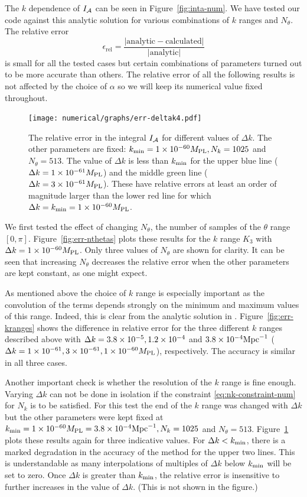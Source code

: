 % 
The $k$ dependence of $I_\A$ can be seen in Figure~\ref{fig:inta-num}. 
We have tested our code against this analytic solution for various
combinations of $k$ ranges and $N_\theta$. The relative error
%
\begin{equation}
 \epsilon_\mathrm{rel} = \frac{|\mathrm{analytic}- \mathrm{calculated}
|}{|\mathrm{analytic}|}
\end{equation}
%
is small for all the tested cases but certain combinations of
parameters turned out to be more accurate than others. The relative error of
all the following results is not affected by the choice of $\alpha$ so
we will keep its numerical value fixed throughout.

\begin{figure}[htb]
 \centering
 \texttt{[image: numerical/graphs/err-deltak4.pdf]}
 \caption[Relative error in the integral $I_\A$]{The relative error in the
integral $I_\A$ for different values of $\Delta k$.
The other parameters are fixed: $k_{\mathrm{min}}=1\times10^{-60}M_{\mathrm{PL}}, N_k = 1025$ and
$N_\theta=513$. 
The value of $\Delta k$ is less than $k_{\mathrm{min}}$ for the upper 
blue line ($\Delta k=1\times 10^{-61}M_{\mathrm{PL}}$) and the middle green line ($\Delta
k=3\times 10^{-61}M_{\mathrm{PL}}$). These have relative errors at least an order of magnitude larger
than the lower red line for which $\Delta k=k_{\mathrm{min}}=1\times 10^{-60}M_{\mathrm{PL}}$.}
 \label{fig:err-deltaks}
\end{figure}


We first tested the effect of changing $N_\theta$, the number of
samples of the $\theta$ range $[0,\pi]$.  Figure~\ref{fig:err-nthetas}
plots these results for the $k$ range $K_3$ with $\Delta k =
1\times 10^{-60}M_{\mathrm{PL}}$. Only three values of $N_\theta$ are shown for clarity. It
can be seen that increasing $N_\theta$ decreases the relative error when the other
parameters are kept constant, as one
might expect.


As mentioned above the choice of $k$ range is especially important as
the convolution of the terms depends strongly on the minimum and
maximum values of this range. Indeed, this is clear from the analytic
solution in . Figure~\ref{fig:err-kranges}
shows the difference in relative error for the three different $k$
ranges described above with 
$\Delta k= 3.8\times 10^{-5}, 1.2\times 10^{-4}$ and $3.8\times 10^{-4}\mathrm{Mpc}^{-1}$
($\Delta k= 1\times 10^{-61}, 3\times 10^{-61},1\times 10^{-60}M_{\mathrm{PL}}$),
respectively. The accuracy is similar in all three cases.


Another important check is whether the resolution of the $k$ range is
fine enough. Varying $\Delta k$ can not be done in isolation if the
constraint \eqref{eq:nk-constraint-num} for $N_k$ is to
be satisfied. For this test the end of the $k$ range was changed with $\Delta k$
but the other parameters were kept fixed at $k_{\mathrm{min}}=1\times 10^{-60}M_{\mathrm{PL}}=3.8\times 10^{-4}\mathrm{Mpc}^{-1},
N_k = 1025$ and $N_\theta=513$. Figure~\ref{fig:err-deltaks} plots
these results again for three indicative values.  For $\Delta
k<k_{\mathrm{min}}$, there is a marked degradation in
the accuracy of the method for the upper two lines. This is understandable as many
interpolations of multiples of $\Delta k$ below $k_{\mathrm{min}}$ will be set to
zero. Once $\Delta k$ is greater than $k_{\mathrm{min}}$, the relative error is
insensitive to further increases in the value of $\Delta k$. (This is not shown in
the figure.)



